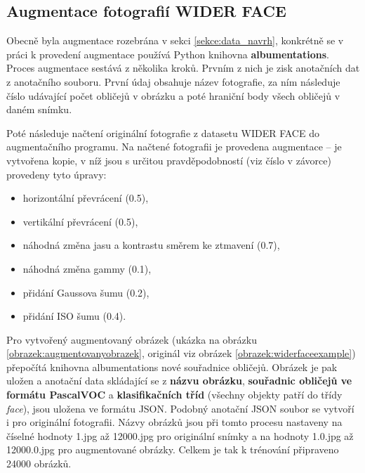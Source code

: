 \subsection*{Augmentace fotografií WIDER FACE}
Obecně byla augmentace rozebrána v sekci \ref{sekce:data_navrh}, konkrétně se v práci k provedení augmentace používá Python knihovna \textbf{albumentations}. Proces augmentace sestává z několika kroků. Prvním z nich
je zisk anotačních dat z anotačního souboru. První údaj obsahuje název fotografie, za ním následuje číslo udávající počet obličejů v obrázku a poté hraniční body všech obličejů v daném snímku.

Poté následuje načtení originální fotografie z datasetu WIDER FACE do augmentačního programu. Na načtené fotografii je provedena augmentace -- je vytvořena kopie, v níž jsou s určitou pravděpodobností (viz číslo v závorce) provedeny tyto úpravy:

\begin{itemize}
  \item horizontální převrácení (0.5),
  \item vertikální převrácení (0.5),
  \item náhodná změna jasu a kontrastu směrem ke ztmavení (0.7),
  \item náhodná změna gammy (0.1),
  \item přidání Gaussova šumu (0.2),
  \item přidání ISO šumu (0.4).
\end{itemize}

Pro vytvořený augmentovaný obrázek (ukázka na obrázku \ref{obrazek:augmentovanyobrazek}, originál viz obrázek \ref{obrazek:widerfaceexample}) přepočítá knihovna albumentations nové souřadnice obličejů. Obrázek je pak uložen a anotační data skládající se z \textbf{názvu obrázku}, \textbf{souřadnic obličejů ve formátu PascalVOC} a \textbf{klasifikačních tříd} (všechny objekty patří do třídy \emph{face}), jsou uložena ve formátu JSON. Podobný anotační JSON soubor se vytvoří i pro originální fotografii. Názvy obrázků jsou při tomto procesu nastaveny na číselné hodnoty 1.jpg až 12000.jpg pro originální snímky a na hodnoty 1.0.jpg až 12000.0.jpg pro augmentované obrázky. Celkem je tak k trénování připraveno 24000 obrázků.

